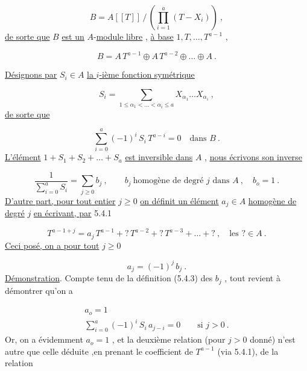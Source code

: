 \begin{equation*}
B = A[[T]] \, / \, \left( \prod_{i=1}^{a} (T-X_i) \right) \ ,
\end{equation*}
\underline{de sorte que} $B$ \underline{est un} $A$-\underline{module libre} , \underline{à base} $1,T,\ldots,T^{a-1}$ ,

\begin{equation}\tag{5.4.1}
B = A \, T^{a-1} \oplus A \, T^{a-2} \oplus \ldots \oplus A \ .
\end{equation}


\underline{Désignons par} $S_i \in A$ \underline{la $i$-ième fonction symétrique}

\begin{equation*}
S_i = \sum_{1 \leq \alpha_1 < \ldots < \alpha_i \leq a} X_{\alpha_1} \ldots X_{\alpha_i} \ ,
\end{equation*}
\underline{de sorte que}

\begin{equation}\tag{5.4.2}
\sum_{i=0}^{a} (-1)^i \, S_i \, T^{a-i} = 0 \quad \mbox{dans } B \ .
\end{equation}
\underline{L'élément} $1 + S_1 + S_2 + \ldots + S_a$ \underline{est inversible dans} $A$ , \underline{nous écrivons son inverse}

\begin{equation}\tag{5.4.3}
\frac{1}{\sum\limits_{i=0}^{a} S_i} = \sum_{j \geq 0} b_j \ , \qquad b_j \ \mbox{homogène de degré } j \mbox{ dans } A \ , \quad b_o = 1 \ .
\end{equation}
\underline{D'autre part, pour tout entier} $j \geq 0$ \underline{on définit un élément} $a_j \in A$ \underline{homogène de degré} $j$ \underline{en écrivant, par} 5.4.1

\begin{equation}\tag{5.4.4}
T^{a-1+j} = a_j \, T^{a-1} + ? \, T^{a-2} + ? \, T^{a-3} + \ldots + ? \ , \quad \mbox{les } ? \in A \ .
\end{equation}
\underline{Ceci posé, on a pour tout} $j \geq 0$

\begin{equation}\tag{5.4.5}
a_j = (-1)^j \, b_j \ .
\end{equation}
\underline{Démonstration}. Compte tenu de la définition (5.4.3) des $b_j$ , tout revient à démontrer qu'on a 



\begin{equation}\tag{5.4.6}
 \begin{array}{l} a_o = 1 \\[4pt] \sum\limits_{i=0}^{a} (-1)^i \, S_i \, a_{j-i} = 0 \qquad \mbox{si } j > 0 \ . \end{array}
\end{equation}
Or, on a évidemment $a_o = 1$ , et la deuxième relation (pour $j > 0$ donné) n'est autre que celle déduite ,en prenant le coefficient de $T^{a-1}$ (via 5.4.1), de la relation

